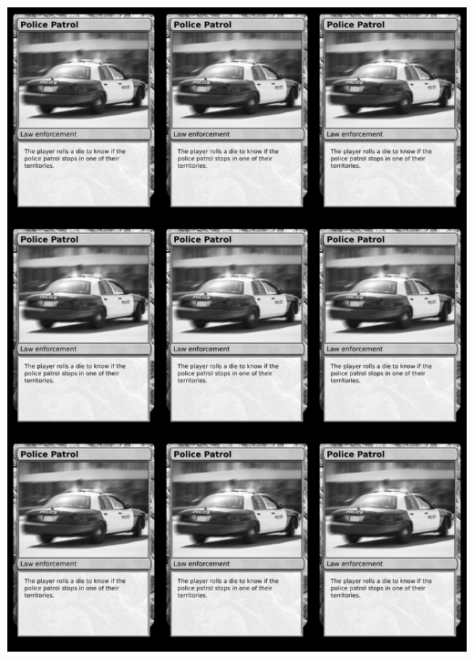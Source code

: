 \documentclass[a4paper]{article}
\begin{document}
\begin{center}
	\centering
	\includegraphics[width=190.5mm,height=266.7mm]{output/temp/page29.png}
\end{center}

\newpage
\end{document}
